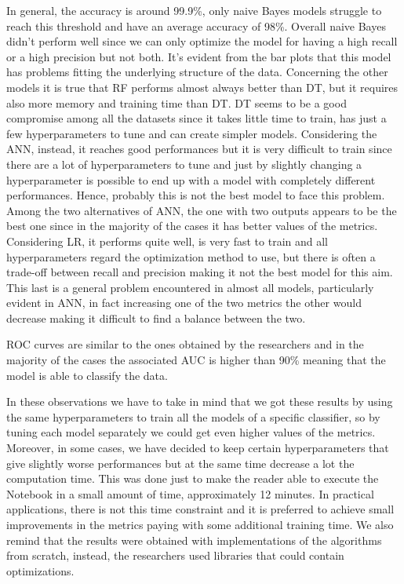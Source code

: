 \documentclass{Configuration_Files/PoliMi3i_thesis}
\begin{document}
In general, the accuracy is around 99.9\%, only naive Bayes models struggle to reach this threshold and have an average accuracy of 98\%.
Overall naive Bayes didn't perform well since we can only optimize the model for having a high recall or a high precision but not both. It's evident from the bar plots that this model has problems fitting the underlying structure of the data. 
Concerning the other models it is true that RF performs almost always better than DT, but it requires also more memory and training time than DT. DT seems to be a good compromise among all the datasets since it takes little time to train, has just a few hyperparameters to tune and can create simpler models.
Considering the ANN, instead, it reaches good performances but it is  very difficult to train since there are a lot of hyperparameters to tune and just by slightly changing a hyperparameter is possible to end up with a model with completely different performances. Hence, probably this is not the best model to face this problem. Among the two alternatives of ANN, the one with two outputs appears to be the best one since in the majority of the cases it has better values of the metrics. Considering LR, it performs quite well, is very fast to train and all hyperparameters regard the optimization method to use, but there is often a trade-off between recall and precision making it not the best model for this aim. This last is a general problem encountered in almost all models, particularly evident in ANN, in fact increasing one of the two metrics the other would decrease making it difficult to find a balance between the two.


ROC curves are similar to the ones obtained by the researchers and in the majority of the cases the associated AUC is higher than 90\% meaning that the model is able to classify the data.

In these observations we have to take in mind that we got these results by using the same hyperparameters to train all the models of a specific classifier, so by tuning each model separately we could get even higher values of the metrics. Moreover, in some cases, we have decided to keep certain hyperparameters that give slightly worse performances but at the same time decrease a lot the computation time. This was done just to make the reader able to execute the Notebook in a small amount of time, approximately 12 minutes. In practical applications, there is not this time constraint and it is preferred to achieve small improvements in the metrics paying with some additional training time. We also remind that the results were obtained with implementations of the algorithms from scratch, instead, the researchers used libraries that could contain optimizations.
\end{document}
